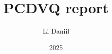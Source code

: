 \documentclass[aspectratio=169]{beamer}
\title{PCDVQ report}
\author{Li Daniil}
\institute{Skoltech}
\date{2025}
\begin{document}
    \frame{\titlepage}
    
    
    
    
    
    
    
    
    
\end{document}
